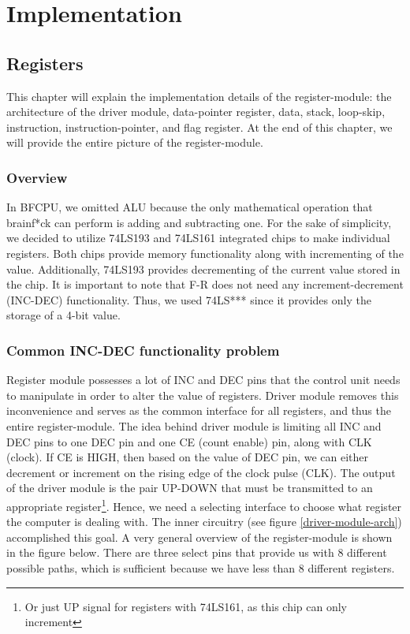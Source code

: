 \section{Implementation} \label{sec:implementation}
\subsection{Registers} \label{sec:implementation:registers}
This chapter will explain the implementation details of the register-module: the architecture of the driver module, data-pointer register, data, stack, loop-skip, instruction, instruction-pointer, and flag register. At the end of this chapter, we will provide the entire picture of the register-module.

\subsubsection{Overview}
In BFCPU, we omitted ALU because the only mathematical operation that brainf*ck can perform is adding and subtracting one. For the sake of simplicity, we decided to utilize 74LS193 and 74LS161 integrated chips to make individual registers. Both chips provide memory functionality along with incrementing of the value. Additionally, 74LS193 provides decrementing of the current value stored in the chip. It is important to note that F-R does not need any increment-decrement (INC-DEC) functionality. Thus, we used 74LS*** since it provides only the storage of a 4-bit value. 

\subsubsection{Common INC-DEC functionality problem}
Register module possesses a lot of INC and DEC pins that the control unit needs to manipulate in order to alter the value of registers. Driver module removes this inconvenience and serves as the common interface for all registers, and thus the entire register-module. The idea behind driver module is limiting all INC and DEC pins to one DEC pin and one CE (count enable) pin, along with CLK (clock). If CE is HIGH, then based on the value of DEC pin, we can either decrement or increment on the rising edge of the clock pulse (CLK). The output of the driver module is the pair UP-DOWN that must be transmitted to an appropriate register\footnote{Or just UP signal for registers with 74LS161, as this chip can only increment}. Hence, we need a selecting interface to choose what register the computer is dealing with. The inner circuitry (see figure \ref{driver-module-arch}) accomplished this goal. A very general overview of the register-module is shown in the figure below. There are three select pins that provide us with 8 different possible paths, which is sufficient because we have less than 8 different registers.

